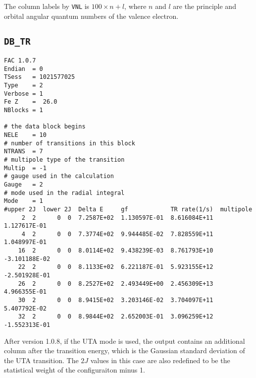 \documentclass[twoside,letterpaper]{refrep}
\begin{document}
The column labels by \verb|VNL| is $100\times n + l$, where $n$ and $l$ 
are the principle and orbital angular quantum numbers of the valence 
electron.

\subsection{\texttt{DB\_TR}}
\begin{verbatim}
FAC 1.0.7
Endian	= 0
TSess	= 1021577025
Type	= 2
Verbose	= 1
Fe Z	=  26.0
NBlocks	= 1

# the data block begins
NELE	= 10
# number of transitions in this block
NTRANS	= 7
# multipole type of the transition
Multip	= -1
# gauge used in the calculation
Gauge	= 2
# mode used in the radial integral
Mode	= 1
#upper 2J  lower 2J  Delta E     gf            TR rate(1/s)  multipole
     2  2      0  0  7.2587E+02  1.130597E-01  8.616084E+11  1.127617E-01
     4  2      0  0  7.3774E+02  9.944485E-02  7.828559E+11  1.048997E-01
    16  2      0  0  8.0114E+02  9.438239E-03  8.761793E+10 -3.101188E-02
    22  2      0  0  8.1133E+02  6.221187E-01  5.923155E+12 -2.501928E-01
    26  2      0  0  8.2527E+02  2.493449E+00  2.456309E+13  4.966355E-01
    30  2      0  0  8.9415E+02  3.203146E-02  3.704097E+11  5.407792E-02
    32  2      0  0  8.9844E+02  2.652003E-01  3.096259E+12 -1.552313E-01
\end{verbatim}

After version 1.0.8, if the UTA mode is used, the output contains an
additional column after the transition energy, which is the Gaussian standard
deviation of the UTA transition. The $2J$ values in this case are also
redefined to be the statistical weight of the configuraiton minus 1.
\end{document}
